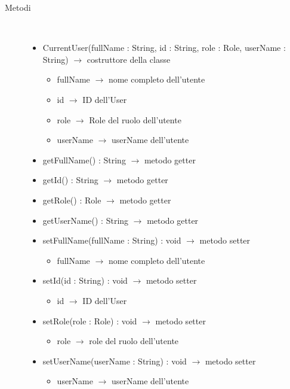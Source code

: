 \begin{description}
\item[Metodi] \hfill \\
\vspace{-7mm}
\begin{itemize}
	\item CurrentUser(fullName : String, id : String, role : Role, userName : String) $\rightarrow$ costruttore della classe\begin{itemize}
		\item fullName $\rightarrow$ nome completo dell'utente
		\item id $\rightarrow$ ID dell'User
		\item role $\rightarrow$ Role del ruolo dell'utente
		\item userName $\rightarrow$ userName dell'utente
	\end{itemize}
	
	\item getFullName() : String $\rightarrow$ metodo getter
	\item getId() : String $\rightarrow$ metodo getter
	\item getRole() : Role $\rightarrow$ metodo getter
	\item getUserName() : String $\rightarrow$ metodo getter
	\item setFullName(fullName : String) : void $\rightarrow$ metodo setter\begin{itemize}
		\item fullName $\rightarrow$ nome completo dell'utente	
	\end{itemize}
	
	\item setId(id : String) : void $\rightarrow$ metodo setter\begin{itemize}
		\item id $\rightarrow$ ID dell'User
	\end{itemize}
	
	\item setRole(role : Role) : void $\rightarrow$ metodo setter\begin{itemize}
		\item role $\rightarrow$ role del ruolo dell'utente
	\end{itemize}
	
	\item setUserName(userName : String) : void $\rightarrow$ metodo setter\begin{itemize}
		\item userName $\rightarrow$ userName dell'utente
	\end{itemize}
	
\end{itemize}

\end{description}

